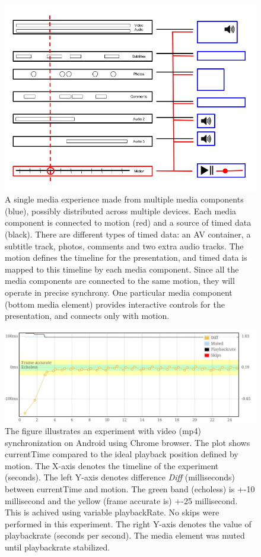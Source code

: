 \documentclass[graybox]{svmult}
\begin{document}
\begin{figure}[h]
\centering
\includegraphics[scale=.4]{fig/motion-media.png}
\caption{A single media experience made from multiple media components (blue), possibly distributed across multiple devices. Each media component is connected to motion (red) and a source of timed data (black). There are different types of timed data: an AV container, a subtitle track, photos, comments and two extra audio tracks. The motion defines the timeline for the presentation, and timed data is mapped to this timeline by each media component. Since all the media components are connected to the same motion, they will operate in precise synchrony. One particular media component (bottom media element) provides interactive controls for the presentation, and connects only with motion.}
\label{fig:motion-media}
\end{figure}

\begin{figure}[h]
\centering
\includegraphics[scale=.23]{fig/android-video.png}
\caption{The figure illustrates an experiment with video (mp4) synchronization on
Android using Chrome browser. The plot shows currentTime compared to the ideal
playback position defined by motion. The X-axis denotes the timeline of the experiment (seconds).
The left Y-axis denotes difference \emph{Diff} (milliseconds) between currentTime and motion.
The green band (echoless) is +-10 millisecond and the yellow (frame accurate is) +-25 millisecond. 
This is achived using variable playbackRate. No skips were performed in this experiment. 
The right Y-axis denotes the value of playbackrate (seconds per second). The media element was muted until playbackrate stabilized.}
\label{fig:videosync}
\end{figure}
\end{document}
